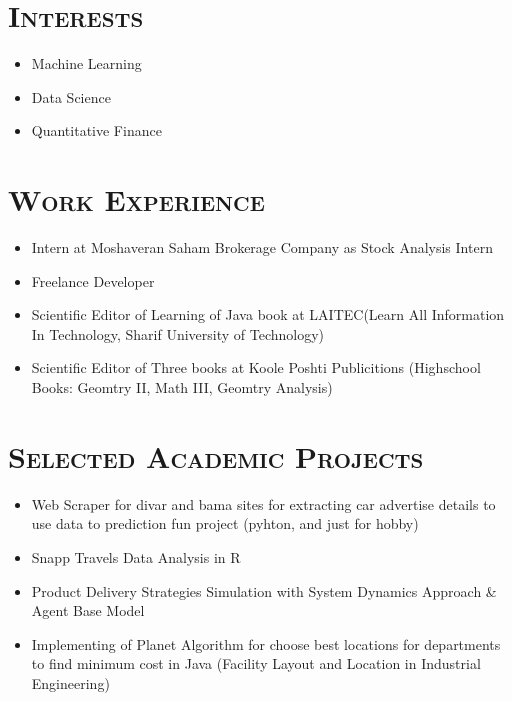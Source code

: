 \documentclass[line,margin]{res}
\begin{document}
\begin{resume}
\begin{spacing}{1.1}
\section{\textsc{Interests}}
\begin{itemize}
\item Machine Learning
\item Data Science
\item Quantitative Finance
\end{itemize}

\section{\textsc{Work Experience}}
\begin{itemize}
\item Intern at Moshaveran Saham Brokerage Company as Stock Analysis Intern
\item Freelance Developer
\item Scientific Editor of Learning of Java book at LAITEC(Learn All Information In Technology, Sharif University of Technology)
\item Scientific Editor of Three books at Koole Poshti Publicitions (Highschool Books: Geomtry II, Math
III, Geomtry Analysis)
\end{itemize}

\section{\textsc{Selected Academic Projects}}
\begin{itemize}
\item Web Scraper for divar and bama sites for extracting car advertise details  to use data to prediction fun project (pyhton, and just for hobby)
\item Snapp Travels Data Analysis in R
\item Product Delivery Strategies Simulation with System Dynamics Approach \& Agent Base Model
\item  Implementing of Planet Algorithm for choose best locations for departments to find minimum cost in Java (Facility Layout and Location in Industrial Engineering)


\end{itemize}
\end{spacing}
\end{resume}
\end{document}

